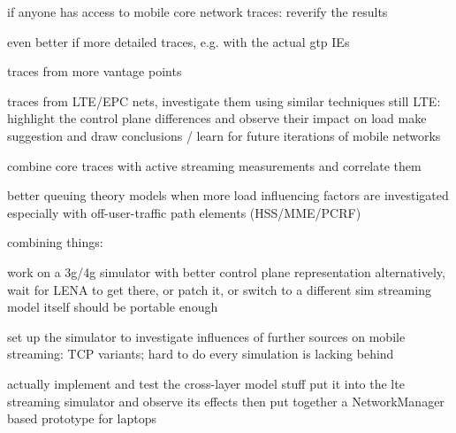 	if anyone has access to mobile core network traces: reverify the results

	even better if more detailed traces, e.g. with the actual \gls{gtp} \glspl{IE}

	traces from more vantage points

	traces from \gls{LTE}/\gls{EPC} nets, investigate them using similar techniques
	still LTE: highlight the control plane differences and observe their impact on load
	make suggestion and draw conclusions / learn for future iterations of mobile networks

	combine core traces with active streaming measurements and correlate them

	better queuing theory models when more load influencing factors are investigated
	especially with off-user-traffic path elements (HSS/MME/PCRF)


combining things:

	work on a 3g/4g simulator with better control plane representation
	alternatively, wait for LENA to get there, or patch it, or switch to a different sim
	streaming model itself should be portable enough

	set up the simulator to investigate influences of further sources on mobile streaming:
	TCP variants; hard to do every simulation is lacking behind


	actually implement and test the cross-layer model stuff
	put it into the lte streaming simulator and observe its effects
	then put together a NetworkManager based prototype for laptops
